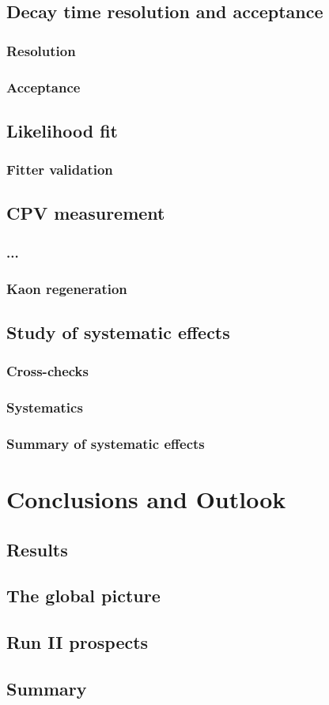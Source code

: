 \section{Decay time resolution and acceptance}
\subsection{Resolution}
\subsection{Acceptance}
\section{Likelihood fit}
\subsection{Fitter validation}
\section{CPV measurement}
\subsection{...}
\subsection{Kaon regeneration}
\section{Study of systematic effects}
\subsection{Cross-checks}
\subsection{Systematics}
\subsection{Summary of systematic effects}

\chapter{Conclusions and Outlook}
\section{Results}
\section{The global picture}
\section{Run II prospects}
\section{Summary}
